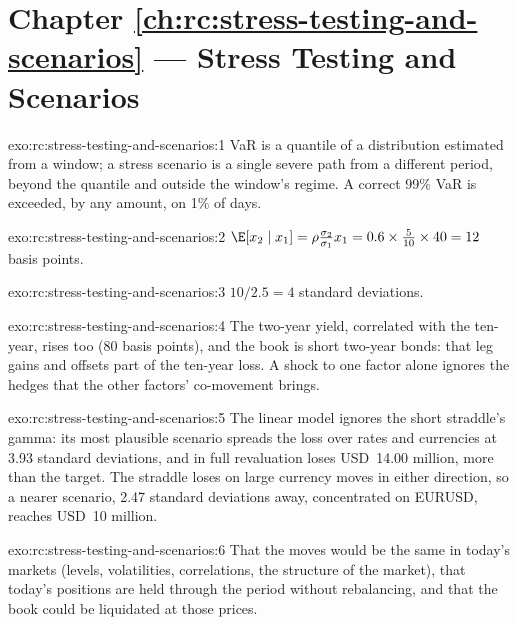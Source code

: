 \section*{Chapter \ref{ch:rc:stress-testing-and-scenarios} --- Stress Testing and Scenarios}

\begin{solution}{exo:rc:stress-testing-and-scenarios:1}
VaR is a quantile of a distribution estimated from a window; a stress scenario is a single severe
path from a different period, beyond the quantile and outside the window's regime. A correct 99\%
VaR is exceeded, by any amount, on 1\% of days.
\end{solution}

\begin{solution}{exo:rc:stress-testing-and-scenarios:2}
$\E[x_2\mid x_1] = \rho\frac{\sigma_2}{\sigma_1}x_1 = 0.6\times\frac{5}{10}\times40 = 12$ basis points.
\end{solution}

\begin{solution}{exo:rc:stress-testing-and-scenarios:3}
$10/2.5 = 4$ standard deviations.
\end{solution}

\begin{solution}{exo:rc:stress-testing-and-scenarios:4}
The two-year yield, correlated with the ten-year, rises too (80 basis points), and the book is short
two-year bonds: that leg gains and offsets part of the ten-year loss. A shock to one factor alone
ignores the hedges that the other factors' co-movement brings.
\end{solution}

\begin{solution}{exo:rc:stress-testing-and-scenarios:5}
The linear model ignores the short straddle's gamma: its most plausible scenario spreads the loss
over rates and currencies at 3.93 standard deviations, and in full revaluation loses USD~14.00
million, more than the target. The straddle loses on large currency moves in either direction, so a
nearer scenario, 2.47 standard deviations away, concentrated on EURUSD, reaches USD~10 million.
\end{solution}

\begin{solution}{exo:rc:stress-testing-and-scenarios:6}
That the moves would be the same in today's markets (levels, volatilities, correlations, the
structure of the market), that today's positions are held through the period without rebalancing,
and that the book could be liquidated at those prices.
\end{solution}

